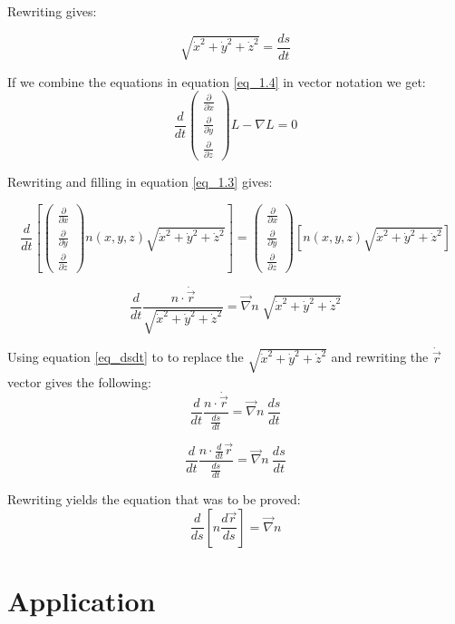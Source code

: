 \documentclass{article}
\def\Nabla{
	\begin{pmatrix}
		\frac{\partial}{\partial {x}} \\
		\frac{\partial}{\partial {y}} \\
		\frac{\partial}{\partial {z}}
	\end{pmatrix}}
\def\dNabla{
	\begin{pmatrix}
		\frac{\partial}{\partial \dot{x}} \\
		\frac{\partial}{\partial \dot{y}} \\
		\frac{\partial}{\partial \dot{z}}
	\end{pmatrix}}
\begin{document}
Rewriting gives:

\begin{equation}
	\label{eq_dsdt}
	\sqrt{\dot{x}^2+\dot{y}^2+\dot{z}^2} = \frac{ds}{dt}
\end{equation}

If we combine the equations in equation \ref{eq_1.4} in vector notation we get: \\

\begin{equation*}
	\frac{d}{dt} \dNabla L - \nabla L = 0
\end{equation*}

Rewriting and filling in equation \ref{eq_1.3} gives:

\begin{equation*}
	\frac{d}{dt} \left[ \dNabla n(x,y,z)\sqrt{\dot{x}^2+\dot{y}^2+\dot{z}^2} \right] = \Nabla \left[ n(x,y,z)\sqrt{\dot{x}^2+\dot{y}^2+\dot{z}^2} \right]
\end{equation*}

\begin{equation*}
	\frac{d}{dt}  \frac{n \cdot \dot{\vec{r}} }{\sqrt{\dot{x}^2+\dot{y}^2+\dot{z}^2}}   = \vec{\nabla} n \; \sqrt{\dot{x}^2+\dot{y}^2+\dot{z}^2}
\end{equation*}

Using equation \ref{eq_dsdt} to to replace the $\sqrt{\dot{x}^2+\dot{y}^2+\dot{z}^2}$ and rewriting the $\dot{\vec{r}}$ vector gives the following: \\

\begin{equation*}
	\frac{d}{dt} \frac{n \cdot \dot{\vec{r}}}{\frac{ds}{dt}}  = \vec{\nabla} n \: \frac{ds}{dt}
\end{equation*}

\begin{equation*}
	\frac{d}{dt}  \frac{n \cdot \frac{d}{dt} \vec{r}}{\frac{ds}{dt}}   =  \vec{\nabla} n \: \frac{ds}{dt}
\end{equation*}

Rewriting yields the equation that was to be proved: \\

\begin{equation*}
	\frac{d}{ds} \left[ n \frac{d \vec{r}}{ds} \right] = \vec{\nabla} n
\end{equation*}

\section{Application}
\end{document}
